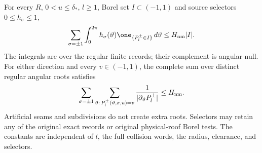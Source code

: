 \begin{theorem}
\label{thm:nm-kernel}
For every $R$, $0<u\le\delta_*$, $l\ge1$, Borel set
$I\subset(-1,1)$ and source selectors $0\le h_\sigma\le1$,
\begin{equation}\label{eq:nm-kernel}
 \sum_{\sigma=\pm1}\int_0^{2\pi}
    h_\sigma(\vartheta)\one_{\{P_l^\pm\in I\}}\,d\vartheta
                   \le H_{\rm nm}|I|.
\end{equation}
The integrals are over the regular finite records; their complement
is angular-null.  For either direction and every $v\in(-1,1)$,
the complete sum over distinct regular angular roots satisfies
\begin{equation}\label{eq:nm-roots}
 \sum_{\sigma=\pm1}
 \sum_{\vartheta:\,P_l^\pm(\vartheta,\sigma,u)=v}
       \frac{1}{|\partial_\vartheta P_l^\pm|}
                    \le H_{\rm nm}.
\end{equation}
Artificial seams and subdivisions do not create extra roots.
Selectors may retain any of the original exact records or original
physical-roof Borel tests.  The constants are independent of $l$,
the full collision words, the radius, clearance, and selectors.
\end{theorem}
